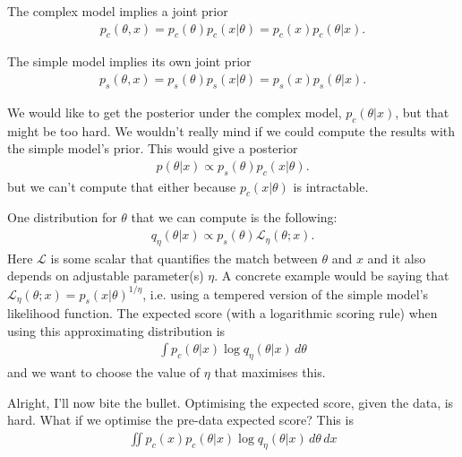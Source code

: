 \documentclass[a4paper, 11pt]{article}
\begin{document}

The complex model implies a joint prior
\begin{eqnarray}
p_c(\theta, x) = p_c(\theta)p_c(x|\theta) = p_c(x)p_c(\theta|x).
\end{eqnarray}

The simple model implies its own joint prior
\begin{eqnarray}
p_s(\theta, x) = p_s(\theta)p_s(x|\theta) = p_s(x)p_s(\theta|x).
\end{eqnarray}

We would like to get the posterior under the complex model, $p_c(\theta|x)$,
but that might be too hard.
We wouldn't really mind if we could compute the results with the
simple model's prior. This would give a posterior
\begin{eqnarray}
p(\theta | x) \propto p_s(\theta)p_c(x|\theta).
\end{eqnarray}
but we can't compute that either because $p_c(x|\theta)$ is intractable.

One distribution for $\theta$ that we can compute is the following:
\begin{eqnarray}
q_\eta(\theta | x) \propto p_s(\theta)\mathcal{L}_\eta(\theta; x).
\end{eqnarray}
Here $\mathcal{L}$ is some scalar that quantifies the match between $\theta$ and
$x$ and it also depends on adjustable parameter(s) $\eta$. A concrete example
would be saying that $\mathcal{L}_\eta(\theta; x) = p_s(x|\theta)^{1/\eta}$, i.e.
using a tempered version of the simple model's likelihood function.
The expected score (with a logarithmic scoring rule) when using this approximating
distribution is
\begin{eqnarray}
\int p_c(\theta | x) \log q_\eta(\theta | x) \, d\theta
\end{eqnarray}
and we want to choose the value of $\eta$ that maximises this.



Alright, I'll now bite the bullet. Optimising the expected score, given the data,
is hard. What if we optimise the pre-data expected score? This is
\begin{eqnarray}
\iint p_c(x) p_c(\theta | x) \log q_\eta(\theta | x) \, d\theta \, dx
\end{eqnarray}
\end{document}
